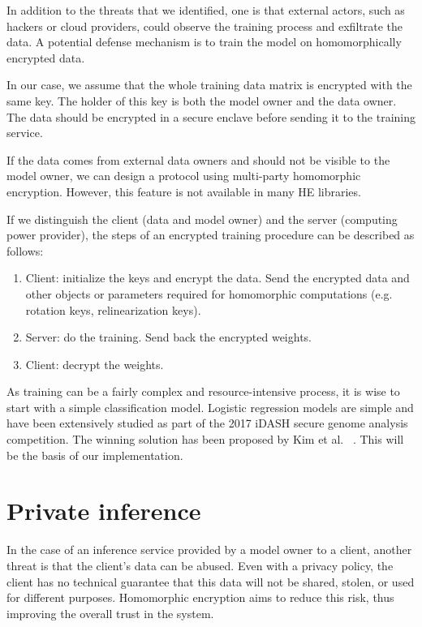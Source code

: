 \documentclass[a4paper,11pt,oneside]{report}
\begin{document}
In addition to the threats that we identified, one is that external actors, such as hackers or cloud providers, could observe the training process and exfiltrate the data. A potential defense mechanism is to train the model on homomorphically encrypted data.

In our case, we assume that the whole training data matrix is encrypted with the same key. The holder of this key is both the model owner and the data owner. The data should be encrypted in a secure enclave before sending it to the training service. 

If the data comes from external data owners and should not be visible to the model owner, we can design a protocol using multi-party homomorphic encryption. However, this feature is not available in many HE libraries.

If we distinguish the client (data and model owner) and the server (computing power provider), the steps of an encrypted training procedure can be described as follows:
\begin{enumerate}
    \item Client: initialize the keys and encrypt the data. Send the encrypted data and other objects or parameters required for homomorphic computations (e.g. rotation keys, relinearization keys).
    \item Server: do the training. Send back the encrypted weights.
    \item Client: decrypt the weights.
\end{enumerate}

As training can be a fairly complex and resource-intensive process, it is wise to start with a simple classification model. Logistic regression models are simple and have been extensively studied as part of the 2017 iDASH secure genome analysis competition. The winning solution has been proposed by Kim et al. ~\cite{kim_logistic_2018}. This will be the basis of our implementation.


\section{Private inference}

In the case of an inference service provided by a model owner to a client, another threat is that the client's data can be abused. Even with a privacy policy, the client has no technical guarantee that this data will not be shared, stolen, or used for different purposes. Homomorphic encryption aims to reduce this risk, thus improving the overall trust in the system. 
\end{document}
